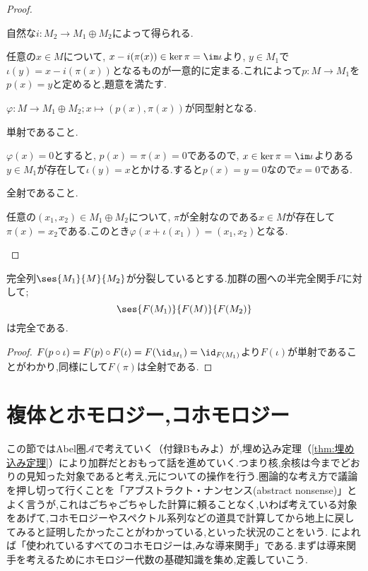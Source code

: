 \begin{proof}
	\begin{eqv}[3]
		\item 自然な$i:M_2\to M_1\oplus M_2$によって得られる.
		
		\item 任意の$x\in M$について, $x-i(\pi(x))\in\ker\pi=\im\iota$より, $y\in M_1$で$\iota(y)=x-i(\pi(x))$となるものが一意的に定まる.これによって$p:M\to M_1$を$p(x)=y$と定めると,題意を満たす.
		
		\item $\varphi:M\to M_1\oplus M_2;x\mapsto(p(x),\pi(x))$が同型射となる.
		\begin{step}
			\item 単射であること.
			
			$\varphi(x)=0$とすると, $p(x)=\pi(x)=0$であるので, $x\in\ker\pi=\im\iota$よりある$y\in M_1$が存在して$\iota(y)=x$とかける.すると$p(x)=y=0$なので$x=0$である.
			
			\item 全射であること.
			
			任意の$(x_1,x_2)\in M_1\oplus M_2$について, $\pi$が全射なのである$x\in M$が存在して$\pi(x)=x_2$である.このとき$\varphi(x+\iota(x_1))=(x_1,x_2)$となる.
		\end{step}
		
	\end{eqv}
\end{proof}

\begin{thm}\label{thm:分裂しているなら完全性は保存される}
	完全列$\ses{M_1}{M}{M_2}$が分裂しているとする.加群の圏への半完全関手$F$に対して;
	\[\ses{F(M_1)}{F(M)}{F(M_2)}\]
	は完全である.
\end{thm}

\begin{proof}
	$F(p\circ\iota)=F(p)\circ F(\iota)=F(\id_{M_1})=\id_{F(M_1)}$より$F(\iota)$が単射であることがわかり,同様にして$F(\pi)$は全射である.
\end{proof}
\section{複体とホモロジー,コホモロジー}

この節ではAbel圏$\mathscr{A}$で考えていく（付録Bもみよ）が,埋め込み定理（\ref{thm:埋め込み定理}）により加群だとおもって話を進めていく.つまり核,余核は今までどおりの見知った対象であると考え,元についての操作を行う.圏論的な考え方で議論を押し切って行くことを「アブストラクト・ナンセンス(abstract nonsense)」とよく言うが,これはごちゃごちゃした計算に頼ることなく,いわば考えている対象をあげて,コホモロジーやスペクトル系列などの道具で計算してから地上に戻してみると証明したかったことがわかっている,といった状況のことをいう. \cite{kato}によれば「使われているすべてのコホモロジーは,みな導来関手」である.まずは導来関手を考えるためにホモロジー代数の基礎知識を集め,定義していこう.
	
